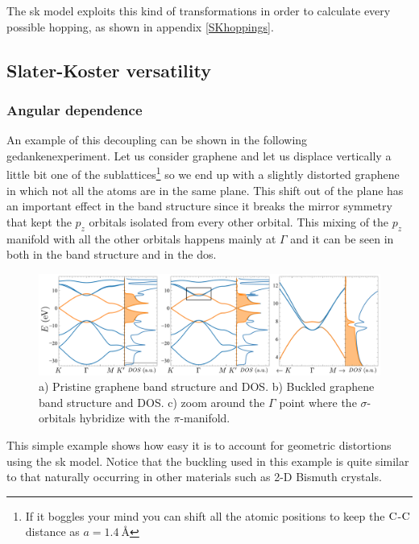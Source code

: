 The \ac{sk} model exploits this kind of transformations in order to calculate every possible hopping, as shown in appendix \ref{SKhoppings}.


\subsection{Slater-Koster versatility}


\subsubsection{Angular dependence}
An example of this decoupling can be shown in the following gedankenexperiment. Let us consider graphene and let us displace vertically a little bit one of the sublattices\footnote{If it boggles your mind you can shift all the atomic positions to keep the $\ce{C}$-$\ce{C}$ distance as $a=\SI{1.4}{\angstrom}$}
so we end up with a slightly distorted graphene in which not all the atoms are in the same plane. This shift out of the plane has an important effect in the band structure since it breaks the mirror symmetry that kept the $p_z$ orbitals isolated from every other orbital.
This mixing of the $p_z$ manifold with all the other orbitals happens mainly at $\Gamma$ and it can be seen in both in the band structure and in the \ac{dos}.
\begin{figure}[h!]
\centering
\includegraphics{graphene/figures/banddos_G_buck.pdf}
\vspace{-5pt}
\caption{a) Pristine graphene band structure and DOS. b) Buckled graphene band structure and DOS. c) zoom around the $\Gamma$ point where the $\sigma$-orbitals hybridize with the $\pi$-manifold.}
\label{fig:buckling}
\end{figure}
\FloatBarrier
This simple example shows how easy it is to account for geometric distortions using the \ac{sk} model. Notice that the buckling used in this example is quite similar to that naturally occurring in other materials such as 2-D Bismuth crystals.

